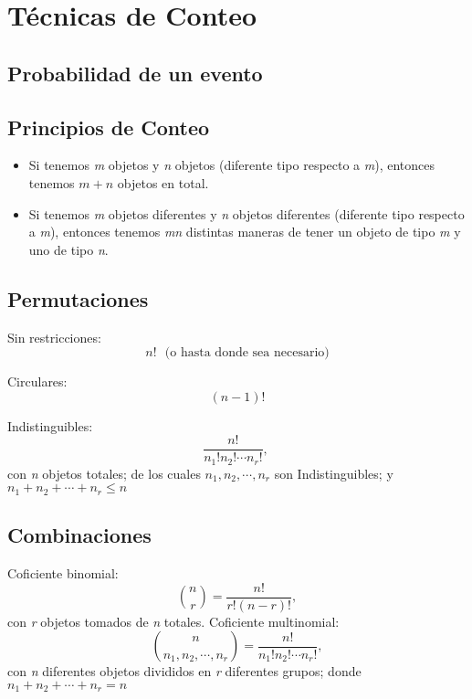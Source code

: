 \chapter{Técnicas de Conteo}
\section{Probabilidad de un evento}

\section{Principios de Conteo}
\begin{itemize}
  \item Si tenemos \textit m objetos y \textit n objetos (diferente tipo respecto a \textit m), entonces tenemos $m + n$ objetos en total.
  \item Si tenemos \textit m objetos diferentes y \textit n objetos diferentes (diferente tipo respecto a \textit m), entonces tenemos \textit{mn} distintas maneras de tener un objeto de tipo \textit m y uno de tipo \textit n.
\end{itemize}

\section{Permutaciones}
Sin restricciones:
$$n!~~~(\text{o hasta donde sea necesario)}$$

\noindent Circulares:
$$(n - 1)!$$

\noindent Indistinguibles:
$$\frac{n!}{n_1!n_2!\cdots n_r!},~$$ con \textit n objetos totales; de los cuales $n_1,n_2, \cdots, n_r$ son Indistinguibles; y $n_1 + n_2 + \cdots + n_r \le n$

\section{Combinaciones}
Coficiente binomial:
$$\binom{n}{r} = \frac{n!}{r!(n - r)!},$$ con \textit r objetos tomados de \textit n totales.
\newline
\noindent Coficiente multinomial:
$$\binom{n}{n_1,n_2,\cdots,n_r} = \frac{n!}{n_1!n_2!\cdots n_r!},$$ con \textit n diferentes objetos divididos en \textit r diferentes grupos; donde $n_1 + n_2 + \cdots + n_r = n$
